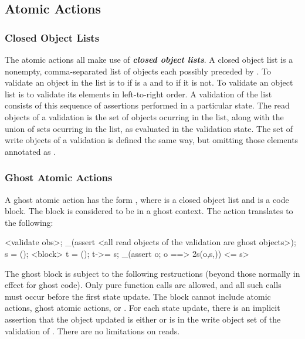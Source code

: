 \documentclass[preprint,nocopyrightspace]{sigplanconf}
\newcommand{\Def}[1]{\textit{\textbf{#1}}}
\begin{document}
{{{\begin{VCC}
\subsection{Atomic Actions}

\subsubsection{Closed Object Lists}
The atomic actions all make use of \Def{closed object lists}. A closed
object list is a nonempty, comma-separated list of objects
each possibly preceded
by . To validate an object  in the list is to 
 if  is a \vcc{\claim} and to
 if it is not.
To validate an object list is to validate its elements in
left-to-right order. A validation of the list consists of this
sequence of assertions performed in a particular state. The read
objects of a validation is the set of objects ocurring in the list,
along with the union of sets ocurring in the list, as evaluated in the
validation state. The set of write objects of a validation is defined
the same way, but omitting those elements annotated
as .

\subsubsection{Ghost Atomic Actions}
A ghost atomic action has the form ,
where  is a closed object list and  is a code
block. The block is considered to be in a ghost context. 
The action translates to the following:

\begin{VCC}
<validate obs>;
_(assert <all read objects of the validation are ghost objects>);
\state s = \now();
<block>
\state t = \now();
t->\last = s;
_(assert \forall \object o; o 
  ==> \inv2s(o,s,\now))
<\last = s>
\end{VCC}

The ghost block is subject to the following restructions (beyond those
normally in effect for ghost code). Only pure function calls are
allowed, and all such calls must occur before the first state update. The
block cannot include atomic actions, ghost atomic
actions,  or . For each state update,
there is an implicit assertion that the object updated is
either \vcc{\mutable} or is in the write object set of the validation
of . There are no limitations on reads.


\end{VCC}}}}
\end{document}
